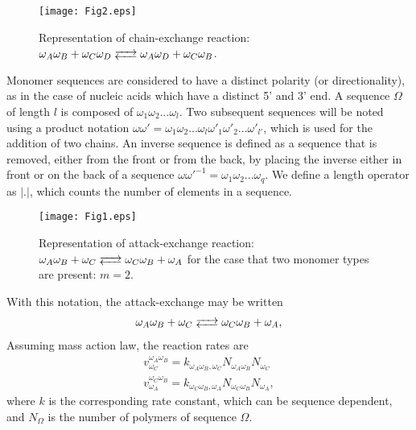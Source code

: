\documentclass[
	amsmath,
	amssymb,
	a4paper,
	aip,		%
	jcp,		%
	reprint, twocolumn  %
	fleqn,
	showpacs,
	floatfix
]{revtex4-1}
\begin{document}
 \begin{figure}[H]
\centering
\texttt{[image: Fig2.eps]} 
\caption{Representation of chain-exchange reaction: 
$ \omega_{A}\omega_{B} +\omega_{C}\omega_{D} \ce{<-->} \omega_{A}\omega_{D} +\omega_{C}\omega_{B}$.}
\label{Exchreac2}
\end{figure}

Monomer sequences are considered to have a distinct polarity (or directionality), as in the case of nucleic acids which have a distinct 5' and 3' end. A sequence $\Omega$ of length $l$ is composed of $\omega_{1} 
\omega_{2} ... \omega_{l}$. Two subsequent sequences will be noted using a product notation $\omega \omega'= \omega_{1} \omega_{2} ... 
\omega_{l} \omega '_{1} \omega '_{2} ... \omega '_{l'}$, which is used for the addition of two chains. An inverse sequence is defined as a 
sequence that is removed, either from the front or from the back, by placing the inverse either in front or on the back of a sequence 
$\omega \omega'^{-1}= \omega_{1} \omega_{2} ... \omega_{q}$. We define a length operator as $| . |$, which counts the number of elements 
in a sequence.
\begin{figure}[H]
\centering
\texttt{[image: Fig1.eps]} 
\caption{Representation of attack-exchange reaction: 
$\omega_{A}\omega_{B} +\omega_{C} \ce{<-->} \omega_{C}\omega_{B} +\omega_{A}$ for the case 
that two monomer types are present: $m=2$.}
\label{Exchreac1}
\end{figure}
With this notation, the attack-exchange may be written
\begin{equation}
	\begin{split}
\omega_{A}\omega_{B} +\omega_{C} \ce{<-->} \omega_{C}\omega_{B} +\omega_{A} ,
\label{Attexreac}
\end{split} 
\end{equation}
Assuming mass action law, the reaction rates are
\begin{equation}
\begin{split}
v^{\omega_{A} \omega_{B}}_{\omega_{C}}=k_{\omega_{A} \omega_{B}, \omega_{C} }  N_{\omega_{A} \omega_{B}} N_{\omega_{C}} \\
v^{\omega_{C} \omega_{B}}_{\omega_{A}}=k_{\omega_{C} \omega_{B}, \omega_{A} }  N_{\omega_{C} \omega_{B}} N_{\omega_{A} },
\label{Rateattex}
\end{split} 
\end{equation}
where $k$ is the corresponding rate constant, which can be sequence dependent, and 
$N_{\Omega}$ is the number of polymers of sequence $\Omega$. 
\end{document}
